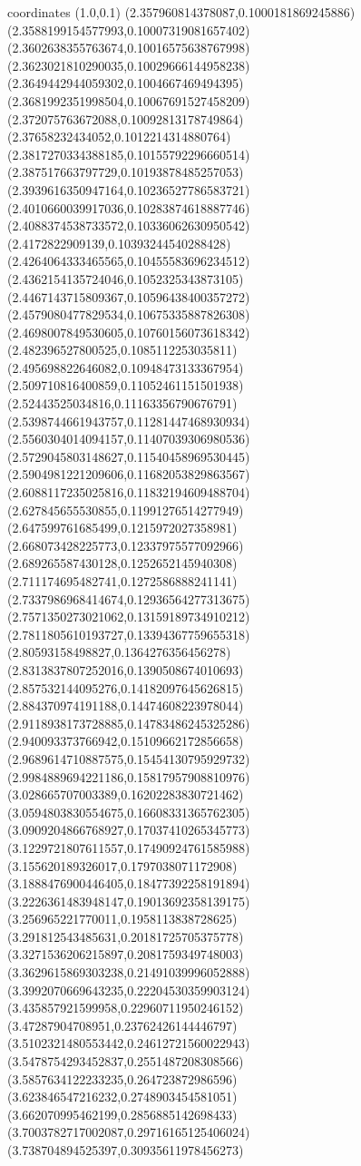 coordinates {%
(1.0,0.1)
(2.357960814378087,0.1000181869245886)
(2.3588199154577993,0.10007319081657402)
(2.3602638355763674,0.10016575638767998)
(2.3623021810290035,0.10029666144958238)
(2.3649442944059302,0.1004667469494395)
(2.3681992351998504,0.10067691527458209)
(2.372075763672088,0.10092813178749864)
(2.37658232434052,0.1012214314880764)
(2.3817270334388185,0.10155792296660514)
(2.387517663797729,0.10193878485257053)
(2.3939616350947164,0.10236527786583721)
(2.4010660039917036,0.10283874618887746)
(2.4088374538733572,0.10336062630950542)
(2.4172822909139,0.10393244540288428)
(2.4264064333465565,0.10455583696234512)
(2.4362154135724046,0.1052325343873105)
(2.4467143715809367,0.10596438400357272)
(2.4579080477829534,0.10675335887826308)
(2.4698007849530605,0.10760156073618342)
(2.482396527800525,0.1085112253035811)
(2.495698822646082,0.10948473133367954)
(2.509710816400859,0.11052461151501938)
(2.52443525034816,0.11163356790676791)
(2.5398744661943757,0.11281447468930934)
(2.5560304014094157,0.11407039306980536)
(2.5729045803148627,0.11540458969530445)
(2.5904981221209606,0.11682053829863567)
(2.6088117235025816,0.11832194609488704)
(2.627845655530855,0.11991276514277949)
(2.647599761685499,0.1215972027358981)
(2.668073428225773,0.12337975577092966)
(2.689265587430128,0.1252652145940308)
(2.711174695482741,0.1272586888241141)
(2.7337986968414674,0.12936564277313675)
(2.7571350273021062,0.13159189734910212)
(2.7811805610193727,0.13394367759655318)
(2.80593158498827,0.1364276356456278)
(2.8313837807252016,0.1390508674010693)
(2.857532144095276,0.14182097645626815)
(2.884370974191188,0.14474608223978044)
(2.9118938173728885,0.14783486245325286)
(2.940093373766942,0.15109662172856658)
(2.9689614710887575,0.15454130795929732)
(2.9984889694221186,0.15817957908810976)
(3.028665707003389,0.16202283830721462)
(3.0594803830554675,0.16608331365762305)
(3.0909204866768927,0.17037410265345773)
(3.1229721807611557,0.17490924761585988)
(3.155620189326017,0.1797038071172908)
(3.1888476900446405,0.18477392258191894)
(3.2226361483948147,0.19013692358139175)
(3.256965221770011,0.1958113838728625)
(3.291812543485631,0.20181725705375778)
(3.3271536206215897,0.2081759349748003)
(3.3629615869303238,0.21491039996052888)
(3.3992070669643235,0.22204530359903124)
(3.435857921599958,0.22960711950246152)
(3.47287904708951,0.23762426144446797)
(3.5102321480553442,0.24612721560022943)
(3.5478754293452837,0.2551487208308566)
(3.5857634122233235,0.264723872986596)
(3.623846547216232,0.2748903454581051)
(3.662070995462199,0.2856885142698433)
(3.7003782717002087,0.29716165125406024)
(3.738704894525397,0.30935611978456273)
}
